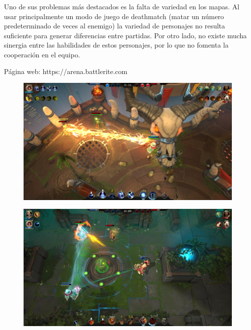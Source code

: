 \vspace{\baselineskip}

Uno de sus problemas más destacados es la falta de variedad en los mapas. Al usar principalmente un modo de juego de deathmatch (matar un número predeterminado de veces al enemigo) la variedad de personajes no resulta suficiente para generar diferencias entre partidas. Por otro lado, no existe mucha sinergia entre las habilidades de estos personajes, por lo que no fomenta la cooperación en el equipo.

\vspace{\baselineskip}

Página web: https://arena.battlerite.com

\begin{figure}[H]
    \centering
    \includegraphics[width=0.95\columnwidth]{images/battlerite1.jpg}    
\end{figure}

\begin{figure}[H]
    \centering
    \includegraphics[width=0.95\columnwidth]{images/battlerite2.jpg}    
\end{figure}


